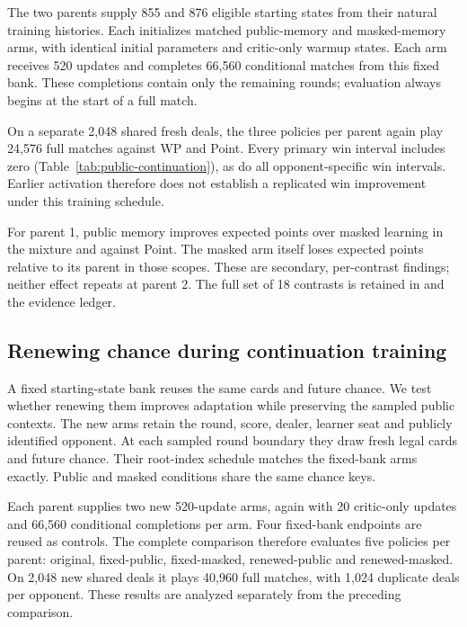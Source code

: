 \documentclass[11pt]{article}
\begin{document}
The two parents supply 855 and 876 eligible starting states from their natural
training histories. Each initializes matched public-memory and masked-memory
arms, with identical initial parameters and critic-only warmup states. Each
arm receives 520 updates and completes 66,560 conditional matches from this
fixed bank. These completions contain only the remaining rounds; evaluation
always begins at the start of a full match.

On a separate 2,048 shared fresh deals, the three policies per parent again
play 24,576 full matches against WP and Point. Every primary win interval
includes zero (Table~\ref{tab:public-continuation}), as do all opponent-specific
win intervals. Earlier activation therefore does not establish a replicated
win improvement under this training schedule.

\begin{table}[ht]
\centering\small

\caption{Public-memory multi-round policy minus each reference, equally weighted
over WP and Point. Brackets give stratified paired 95\% intervals. The four win
comparisons form the primary criterion.}
\label{tab:public-continuation}
\end{table}

For parent 1, public memory improves expected points over masked learning in
the mixture and against Point. The masked arm itself loses expected points
relative to its parent in those scopes. These are secondary, per-contrast
findings; neither effect repeats at parent 2. The full set of 18 contrasts is
retained in  and the evidence ledger.

\subsection{Renewing chance during continuation training}
A fixed starting-state bank reuses the same cards and future chance. We test
whether renewing them improves adaptation while preserving the sampled public
contexts. The new arms retain the round, score, dealer, learner seat and
publicly identified opponent. At each sampled round boundary they draw fresh
legal cards and future chance. Their root-index schedule matches the fixed-bank
arms exactly. Public and masked conditions share the same chance keys.

Each parent supplies two new 520-update arms, again with 20 critic-only updates
and 66,560 conditional completions per arm. Four fixed-bank endpoints are
reused as controls. The complete comparison therefore evaluates five policies
per parent: original, fixed-public, fixed-masked, renewed-public and
renewed-masked. On 2,048 new shared deals it plays 40,960 full matches, with
1,024 duplicate deals per opponent. These results are analyzed separately
from the preceding comparison.
\end{document}
